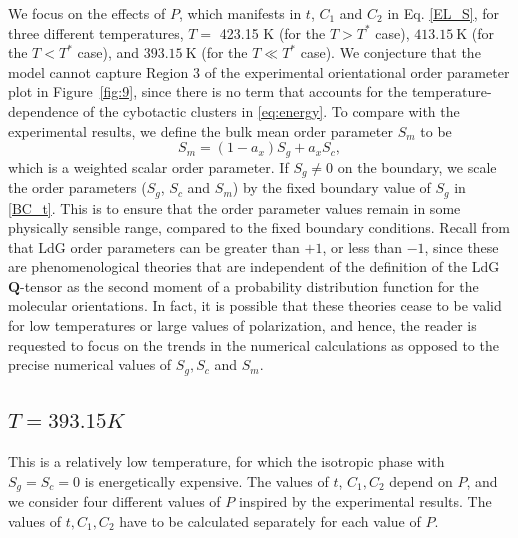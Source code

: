 \documentclass[reprint,amsfonts,amsmath,amssymb,aps,pre,floatfix,10pt]{revtex4-1}
\newcommand\Qvec{\mathbf{Q}}
\begin{document}
We focus on the effects of $P$, which manifests in $t$, $C_1$ and $C_2$ in Eq. \ref{EL_S}, for three different temperatures, \(T=\) 423.15 K (for the \(T > T^*\) case), \(413.15 \mathrm{~K}\) (for the \(T < T^*\) case),  and \(393.15 \mathrm{~K}\) (for the \(T \ll T^*\) case). We conjecture that the model cannot capture Region $3$ of the experimental orientational order parameter plot in Figure~\ref{fig:9}, since there is no term that accounts for the temperature-dependence of the cybotactic clusters in \eqref{eq:energy}. To compare with the experimental results, we define the bulk mean order parameter $S_m$ to be
\begin{equation}
  S_m = (1 - a_x) S_g + a_x S_c,
\end{equation}
which is a weighted scalar order parameter. If $S_g \neq 0$ on the boundary, we scale the order parameters ($S_g$, $S_c$ and $S_m$) by the fixed boundary value of $S_g$ in \eqref{BC_t}. This is to ensure that the order parameter values remain in some physically sensible range, compared to the fixed boundary conditions. Recall from \cite{majumdar2010equilibrium_63} that LdG order parameters can be greater than $+1$, or less than $-1$, since these are phenomenological theories that are independent of the definition of the LdG $\Qvec$-tensor as the second moment of a probability distribution function for the molecular orientations. In fact, it is possible that these theories cease to be valid for low temperatures or large values of polarization, and hence, the reader is requested to focus on the trends in the numerical calculations as opposed to the precise numerical values of $S_g, S_c$ and $S_m$.




\subsection{$T = 393.15 K$}
This is a relatively low temperature, for which the isotropic phase with $S_g = S_c=0$ is energetically expensive. The values of $t$, $C_1, C_2$ depend on $P$, and we consider four different values of $P$ inspired by the experimental results. The values of $t, C_1, C_2$ have to be calculated separately for each value of $P$.
\end{document}
